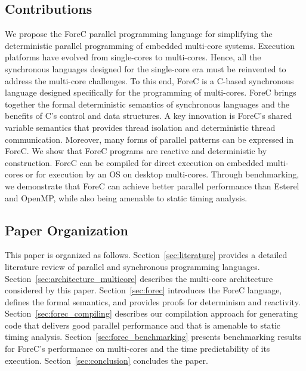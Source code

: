 \subsection{Contributions}
We propose the ForeC parallel programming language for simplifying the
deterministic parallel programming of embedded multi-core systems. 
Execution platforms have evolved from 
single-cores to multi-cores. Hence, all the synchronous languages 
designed for the single-core era must be reinvented to address the 
multi-core challenges. To this end, ForeC is a C-based 
synchronous language designed specifically
for the programming of multi-cores. ForeC brings together the formal 
deterministic semantics of synchronous languages and the benefits of 
C's control and data structures. A key innovation is ForeC's shared 
variable semantics that provides thread isolation and deterministic 
thread communication. Moreover, many forms of parallel patterns
can be expressed in ForeC. We show that ForeC programs are reactive and 
deterministic by construction. ForeC can be compiled for direct execution
on embedded multi-cores or for execution by an OS on desktop multi-cores.
Through benchmarking, we demonstrate that ForeC can achieve better parallel 
performance than Esterel and OpenMP, while also being amenable to static 
timing analysis.

\subsection{Paper Organization}
This paper is organized as follows.
Section~\ref{sec:literature} provides a detailed literature review of
parallel and synchronous programming languages.
Section~\ref{sec:architecture_multicore} describes the multi-core architecture
considered by this paper.
Section~\ref{sec:forec} introduces the ForeC language,
defines the formal semantics, and provides
proofs for determinism and reactivity.
Section~\ref{sec:forec_compiling} describes our compilation
approach for generating code that delivers good parallel performance
and that is amenable to static timing analysis.
Section~\ref{sec:forec_benchmarking} presents benchmarking results
for ForeC's performance on multi-cores and the time predictability
of its execution.
Section~\ref{sec:conclusion} concludes the paper.
